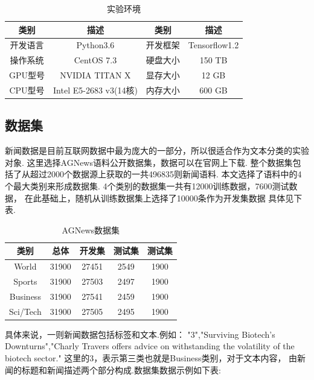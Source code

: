 \documentclass[bachelor,adobefonts]{jnuthesis}
\begin{document}
\begin{table}[h!]
  \centering
  \begin{tabular}{cccc}
    \toprule
    \textbf{类别} & \textbf{描述} & \textbf{类别} & \textbf{描述}\\
    \midrule
    开发语言 & Python3.6  & 开发框架 & Tensorflow1.2\\
    操作系统 & CentOS 7.3 & 硬盘大小 & 150 TB \\
    GPU型号 & NVIDIA TITAN X & 显存大小 & 12 GB \\
    CPU型号 & Intel E5-2683 v3(14核) & 内存大小 & 600 GB\\
    \bottomrule
  \end{tabular}
  \caption{实验环境}
\end{table}

\subsection{数据集}
新闻数据是目前互联网数据中最为庞大的一部分，所以很适合作为文本分类的实验对象.
这里选择AGNews语料公开数据集，数据可以在官网上下载.
整个数据集包括了从超过2000个数据源上获取的一共496835则新闻语料.
本文选择了语料中的4个最大类别来形成数据集.
4个类别的数据集一共有12000训练数据，7600测试数据，
在此基础上，随机从训练数据集上选择了10000条作为开发集数据
具体见下表.

\begin{table}[h!]
  \centering
  \begin{tabular}{ccccc}
    \toprule
    \textbf{类别} & \textbf{总体} & \textbf{开发集} & \textbf{测试集} & \textbf{测试集} \\
    \midrule
    World & 31900 & 27451 & 2549 & 1900 \\
    Sports & 31900 & 27503 & 2497 & 1900 \\
    Business & 31900 & 27541 & 2459 & 1900 \\
    Sci/Tech & 31900 & 27505 & 2495 & 1900 \\
    \bottomrule
  \end{tabular}
  \caption{AGNews数据集}
\end{table}

具体来说，一则新闻数据包括标签和文本.例如：
"3","Surviving Biotech's Downturns","Charly Travers offers advice on withstanding the volatility of the biotech sector."
这里的3，表示第三类也就是Business类别，对于文本内容，
由新闻的标题和新闻描述两个部分构成.数据集数据示例如下表:
\end{document}
